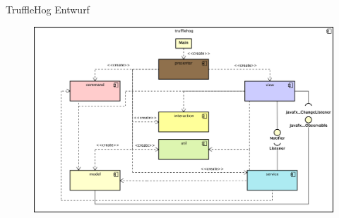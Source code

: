 \begin{frame}{TruffleHog Entwurf}
  \begin{figure}
    \centering
    \includegraphics[width=\textwidth]{./images/trufflehog-component.png}
  \end{figure}
\end{frame}

